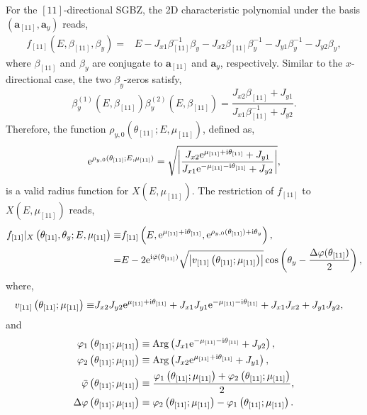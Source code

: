 For the $[11]$-directional SGBZ, the 2D characteristic polynomial
under the basis $(\mathbf{a}_{[11]},\mathbf{a}_{y})$ reads, 
\begin{align}
f_{[11]}\left(E,\beta_{[11]},\beta_{y}\right)= & E-J_{x1}\beta_{[11]}^{-1}\beta_{y}-J_{x2}\beta_{[11]}\beta_{y}^{-1}-J_{y1}\beta_{y}^{-1}-J_{y2}\beta_{y},
\end{align}
where $\beta_{[11]}$ and $\beta_{y}$ are conjugate to $\mathbf{a}_{[11]}$
and $\mathbf{a}_{y}$, respectively. Similar to the $x$-directional
case, the two $\beta_{y}$-zeros satisfy, 
\begin{equation}
\beta_{y}^{(1)}\left(E,\beta_{[11]}\right)\beta_{y}^{(2)}\left(E,\beta_{[11]}\right)=\frac{J_{x2}\beta_{[11]}+J_{y1}}{J_{x1}\beta_{[11]}^{-1}+J_{y2}}.\label{seq:11-product-beta2-zeros}
\end{equation}
Therefore, the function $\rho_{y,0}(\theta_{[11]};E,\mu_{[11]})$,
defined as, 
\begin{equation}
\mathrm{e}^{\rho_{y,0}(\theta_{[11]};E,\mu_{[11]})}=\sqrt{\left|\frac{J_{x2}\mathrm{e}^{\mu_{[11]}+\mathrm{i}\theta_{[11]}}+J_{y1}}{J_{x1}\mathrm{e}^{-\mu_{[11]}-\mathrm{i}\theta_{[11]}}+J_{y2}}\right|},\label{eq:rho-theta11-11}
\end{equation}
is a valid radius function for $X(E,\mu_{[11]})$. The restriction
of $f_{[11]}$ to $X(E,\mu_{[11]})$ reads, 
\begin{align}
f_{[11]}|_{X}\left(\theta_{[11]},\theta_{y};E,\mu_{[11]}\right)\equiv & f_{[11]}\left(E,\mathrm{e}^{\mu_{[11]}+\mathrm{i}\theta_{[11]}},\mathrm{e}^{\rho_{y,0}(\theta_{[11]})+\mathrm{i}\theta_{y}}\right),\nonumber \\
= & E-2\mathrm{e}^{\mathrm{i}\bar{\varphi}(\theta_{[11]})}\sqrt{\left|v_{[11]}\left(\theta_{[11]};\mu_{[11]}\right)\right|}\cos\left(\theta_{y}-\frac{\Delta\varphi(\theta_{[11]})}{2}\right),\label{eq:ChP-on-X-11}
\end{align}
where, 
\begin{align}
v_{[11]}\left(\theta_{[11]};\mu_{[11]}\right)\equiv & J_{x2}J_{y2}\mathrm{e}^{\mu_{[11]}+\mathrm{i}\theta_{[11]}}+J_{x1}J_{y1}\mathrm{e}^{-\mu_{[11]}-\mathrm{i}\theta_{[11]}}+J_{x1}J_{x2}+J_{y1}J_{y2},\label{eq:v-11}
\end{align}
and 
\begin{align}
\varphi_{1}\left(\theta_{[11]};\mu_{[11]}\right) & \equiv\text{Arg}\left(J_{x1}\mathrm{e}^{-\mu_{[11]}-\mathrm{i}\theta_{[11]}}+J_{y2}\right),\\
\varphi_{2}\left(\theta_{[11]};\mu_{[11]}\right) & \equiv\text{Arg}\left(J_{x2}\mathrm{e}^{\mu_{[11]}+\mathrm{i}\theta_{[11]}}+J_{y1}\right),\\
\bar{\varphi}\left(\theta_{[11]};\mu_{[11]}\right) & \equiv\frac{\varphi_{1}\left(\theta_{[11]};\mu_{[11]}\right)+\varphi_{2}\left(\theta_{[11]};\mu_{[11]}\right)}{2},\\
\Delta\varphi\left(\theta_{[11]};\mu_{[11]}\right) & \equiv\varphi_{2}\left(\theta_{[11]};\mu_{[11]}\right)-\varphi_{1}\left(\theta_{[11]};\mu_{[11]}\right).\label{eq:Delta-varphi}
\end{align}
